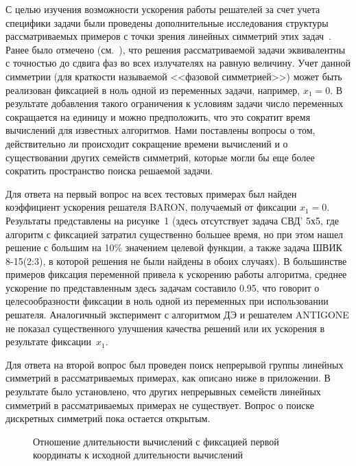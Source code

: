\documentclass{llncs}
\begin{document}
С целью изучения возможности ускорения работы решателей за счет учета специфики задачи были проведены дополнительные исследования
структуры рассматриваемых примеров с точки зрения линейных симметрий этих задач~\cite{yurkov:symmetry}. Ранее было отмечено (см.~\cite{tyunin:daor}), что решения рассматриваемой задачи эквивалентны с точностью до сдвига фаз во всех излучателях на равную величину.
Учет данной симметрии (для краткости называемой <<фазовой симметрией>>) может быть реализован фиксацией в ноль одной из переменных задачи, например, $x_1=0$. В результате добавления такого ограничения к условиям задачи число переменных сокращается на единицу и можно предположить, что это сократит время вычислений для известных алгоритмов. Нами поставлены вопросы о том, действительно ли происходит сокращение времени вычислений и о существовании других семейств симметрий, которые могли бы еще более сократить пространство поиска решаемой задачи. 

Для ответа на первый вопрос на всех тестовых примерах был найден коэффициент ускорения решателя BARON, получаемый от фиксации $x_1=0$. Результаты представлены на рисунке~1 (здесь отсутствует задача СВД' 5х5, где алгоритм с фиксацией затратил существенно большее время, но при этом нашел решение с большим на 10\% значением целевой функции, а также задача ШВИК 8-15(2:3), в которой решения не были найдены в обоих случаях).     В большинстве примеров фиксация переменной привела к ускорению работы алгоритма, среднее ускорение по представленным здесь задачам составило 0.95, что говорит о целесообразности фиксации в ноль одной из переменных при использовании решателя. Аналогичный эксперимент с алгоритмом ДЭ и решателем ANTIGONE не показал существенного улучшения качества решений или их ускорения в результате фиксации~$x_1$. 

Для ответа на второй вопрос был проведен поиск непрерывой группы линейных симметрий в рассматриваемых примерах, как описано ниже в приложении. В результате было установлено, что других непрерывных семейств линейных симметрий в рассматриваемых примерах не существует. Вопрос о поиске дискретных симметрий пока остается открытым.   

\begin{figure}
\caption{Отношение длительности вычислений с фиксацией первой координаты к исходной длительности вычислений}
\label{ris:ring}
\end{figure}
\end{document}
